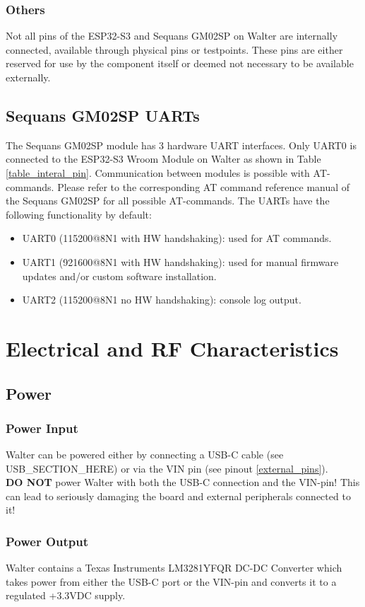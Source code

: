 \documentclass[11pt]{article}
\begin{document}
\subsubsection{Others}
Not all pins of the ESP32-S3 and Sequans GM02SP on Walter are internally connected, available through physical pins or testpoints. These pins are either reserved for use by the component itself or deemed not necessary to be available externally.

\subsection{Sequans GM02SP UARTs} \label{lte_uart}
The Sequans GM02SP module has 3 hardware UART interfaces. Only UART0 is connected to the ESP32-S3 Wroom Module on Walter as shown in Table \ref{table_interal_pin}. Communication between modules is possible with AT-commands. Please refer to the corresponding AT command reference manual of the Sequans GM02SP for all possible AT-commands. The UARTs have the following functionality by default:
\begin{itemize}
	\item UART0 (115200@8N1 with HW handshaking): used for AT commands.
	\item UART1 (921600@8N1 with HW handshaking): used for manual firmware updates and/or custom software installation.
	\item UART2 (115200@8N1 no HW handshaking): console log output.
\end{itemize}

\section{Electrical and RF Characteristics} \label{power_rf_characteristics}
\subsection{Power} \label{power}
\subsubsection{Power Input}
Walter can be powered either by connecting a USB-C cable (see USB\_SECTION\_HERE) or via the VIN pin (see pinout \ref{external_pins}).\\

\textbf{DO NOT} power Walter with both the USB-C connection and the VIN-pin! This can lead to seriously damaging the board and external peripherals connected to it!
\subsubsection{Power Output}
Walter contains a Texas Instruments LM3281YFQR DC-DC Converter which takes power from either the USB-C port or the VIN-pin and converts it to a regulated +3.3VDC supply.
\end{document}
